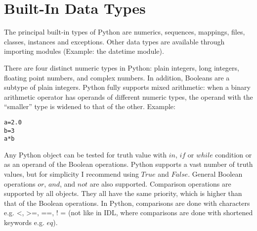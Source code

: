 \section{Built-In Data Types}
\label{s:dtype}
The principal built-in types of Python are numerics, sequences,
mappings, files, classes, instances and exceptions.  Other data types
are available through importing modules (Example: the datetime
module).

There are four distinct numeric types in Python: plain integers, long
integers, floating point numbers, and complex numbers.  In addition,
Booleans are a subtype of plain integers.  Python fully supports mixed
arithmetic: when a binary arithmetic operator has operands of
different numeric types, the operand with the ``smaller'' type is
widened to that of the other.  Example:
\begin{alltt}
\pytab a = 2.0
\pytab b = 3
\pytab a * b
\end{alltt}

Any Python object can be tested for truth value with $in$, $if$ or
$while$ condition or as an operand of the Boolean operations.  Python
supports a vast number of truth values, but for simplicity I recommend
using $True$ and $False$.  General Boolean operations $or$, $and$, and
$not$ are also supported. Comparison operations are supported by all
objects.  They all have the same priority, which is higher than that
of the Boolean operations.  In Python, comparisons are done with
characters e.g. <, >=, ==, ! = (not like in IDL, where comparisons
are done with shortened keywords e.g. $eq$).

